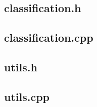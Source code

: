 \documentclass[a4paper,12pt,notitlepage]{article}
\begin{document}
\begin{appendices}
		\subsection{classification.h}
		
		\subsection{classification.cpp}
		\label{app:classificationcpp}
		
		\subsection{utils.h}
		
		\subsection{utils.cpp}
		
\end{appendices}

\vfill
\hrulefill
\end{document}
